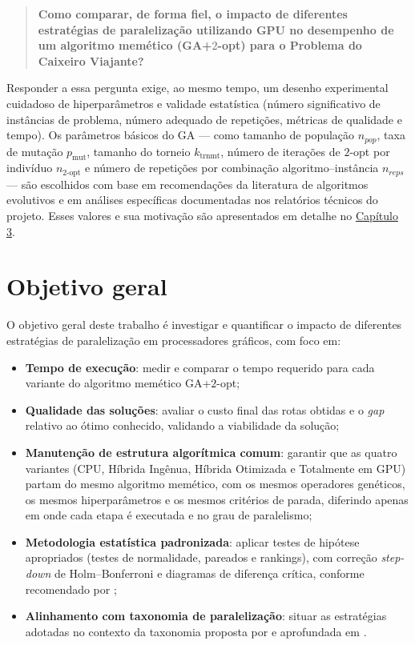 \begin{quote}
      \textbf{Como comparar, de forma fiel, o impacto de diferentes estratégias de paralelização utilizando GPU no desempenho de um algoritmo memético (GA+\(2\)-opt) para o Problema do Caixeiro Viajante?}
\end{quote}

Responder a essa pergunta exige, ao mesmo tempo, um desenho experimental cuidadoso de hiperparâmetros e validade estatística (número significativo de instâncias de problema, número adequado de repetições, métricas de qualidade e tempo).
Os parâmetros básicos do GA — como tamanho de população \(n_{pop}\), taxa de mutação \(p_{\text{mut}}\), tamanho do torneio \(k_{\text{trnmt}}\), número de iterações de \(2\)-opt por indivíduo \(n_{2\text{-opt}}\) e número de repetições por combinação algoritmo--instância \(n_{reps}\) — são escolhidos com base em recomendações da literatura de algoritmos evolutivos \autocite{eiben2015introduction,goldberg1989genetic} e em análises específicas documentadas nos relatórios técnicos do projeto.
Esses valores e sua motivação são apresentados em detalhe no \hyperref[cap3-materiais-metodos]{Capítulo 3}.

\section{Objetivo geral}\label{sec-13-objetivo-geral}

O objetivo geral deste trabalho é investigar e quantificar o impacto de diferentes estratégias de paralelização em processadores gráficos, com foco em:

\begin{itemize}
      \tightlist
      \item
            \textbf{Tempo de execução}: medir e comparar o tempo requerido para cada variante do algoritmo memético GA+\(2\)-opt;
      \item
            \textbf{Qualidade das soluções}: avaliar o custo final das rotas obtidas e o \emph{gap} relativo ao ótimo conhecido, validando a viabilidade da solução;
      \item
            \textbf{Manutenção de estrutura algorítmica comum}: garantir que as quatro variantes (CPU, Híbrida Ingênua, Híbrida Otimizada e Totalmente em GPU) partam do mesmo algoritmo memético, com os mesmos operadores genéticos, os mesmos hiperparâmetros e os mesmos critérios de parada, diferindo apenas em onde cada etapa é executada e no grau de paralelismo;
      \item
            \textbf{Metodologia estatística padronizada}: aplicar testes de hipótese apropriados (testes de normalidade, pareados e rankings), com correção \emph{step-down} de Holm--Bonferroni e diagramas de diferença crítica, conforme recomendado por \textcite{demsar2006statistical};
      \item
            \textbf{Alinhamento com taxonomia de paralelização}: situar as estratégias adotadas no contexto da taxonomia proposta por \textcite{crainic2003parallel} e aprofundada em \textcite{crainic2010parallel}.
\end{itemize}

